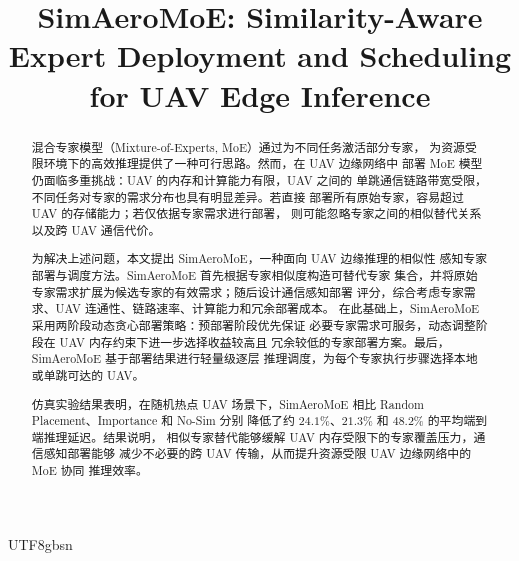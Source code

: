 \documentclass[conference]{IEEEtran}
\begin{document}
\begin{CJK*}{UTF8}{gbsn}

\title{SimAeroMoE: Similarity-Aware Expert Deployment and Scheduling
       for UAV Edge Inference}

\author{%
}

\maketitle

\begin{abstract}
混合专家模型（Mixture-of-Experts, MoE）通过为不同任务激活部分专家，
为资源受限环境下的高效推理提供了一种可行思路。然而，在 UAV 边缘网络中
部署 MoE 模型仍面临多重挑战：UAV 的内存和计算能力有限，UAV 之间的
单跳通信链路带宽受限，不同任务对专家的需求分布也具有明显差异。若直接
部署所有原始专家，容易超过 UAV 的存储能力；若仅依据专家需求进行部署，
则可能忽略专家之间的相似替代关系以及跨 UAV 通信代价。

为解决上述问题，本文提出 SimAeroMoE，一种面向 UAV 边缘推理的相似性
感知专家部署与调度方法。SimAeroMoE 首先根据专家相似度构造可替代专家
集合，并将原始专家需求扩展为候选专家的有效需求；随后设计通信感知部署
评分，综合考虑专家需求、UAV 连通性、链路速率、计算能力和冗余部署成本。
在此基础上，SimAeroMoE 采用两阶段动态贪心部署策略：预部署阶段优先保证
必要专家需求可服务，动态调整阶段在 UAV 内存约束下进一步选择收益较高且
冗余较低的专家部署方案。最后，SimAeroMoE 基于部署结果进行轻量级逐层
推理调度，为每个专家执行步骤选择本地或单跳可达的 UAV。

仿真实验结果表明，在随机热点 UAV 场景下，SimAeroMoE 相比 Random
Placement、Importance 和 No-Sim 分别
降低了约 $24.1\%$、$21.3\%$ 和 $48.2\%$ 的平均端到端推理延迟。结果说明，
相似专家替代能够缓解 UAV 内存受限下的专家覆盖压力，通信感知部署能够
减少不必要的跨 UAV 传输，从而提升资源受限 UAV 边缘网络中的 MoE 协同
推理效率。
\end{abstract}


\end{CJK*}
\end{document}

